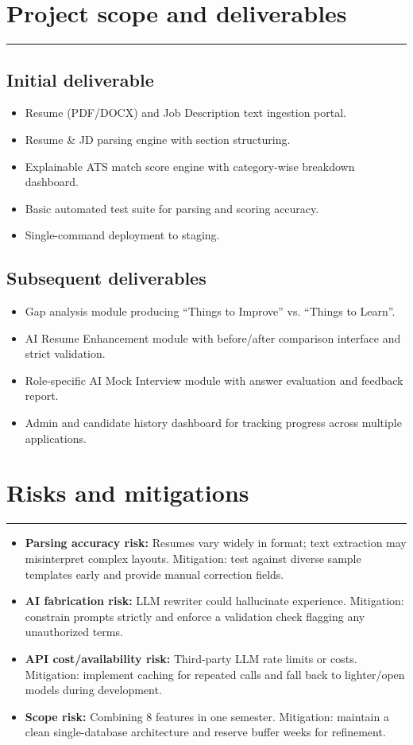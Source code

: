 \documentclass[11pt,a4paper]{article}
\newcommand{\BvrSectionRule}{%
  \par\nobreak\vspace{0.25em}%
  \noindent\rule{\linewidth}{0.4pt}%
  \par\nobreak\vspace{0.4em}%
}
\begin{document}
\section{Project scope and deliverables %
}
\BvrSectionRule
\subsection{Initial deliverable %
}
\begin{itemize}[leftmargin=0.7cm]
    \item Resume (PDF/DOCX) and Job Description text ingestion portal.
    \item Resume \& JD parsing engine with section structuring.
    \item Explainable ATS match score engine with category-wise breakdown dashboard.
    \item Basic automated test suite for parsing and scoring accuracy.
    \item Single-command deployment to staging.
\end{itemize}

\subsection{Subsequent deliverables}
\begin{itemize}[leftmargin=0.7cm]
    \item Gap analysis module producing ``Things to Improve'' vs. ``Things to Learn''.
    \item AI Resume Enhancement module with before/after comparison interface and strict validation.
    \item Role-specific AI Mock Interview module with answer evaluation and feedback report.
    \item Admin and candidate history dashboard for tracking progress across multiple applications.
\end{itemize}

\section{Risks and mitigations}
\BvrSectionRule
\begin{itemize}[leftmargin=0.7cm]
    \item \textbf{Parsing accuracy risk:} Resumes vary widely in format; text extraction may misinterpret complex layouts. Mitigation: test against diverse sample templates early and provide manual correction fields.
    \item \textbf{AI fabrication risk:} LLM rewriter could hallucinate experience. Mitigation: constrain prompts strictly and enforce a validation check flagging any unauthorized terms.
    \item \textbf{API cost/availability risk:} Third-party LLM rate limits or costs. Mitigation: implement caching for repeated calls and fall back to lighter/open models during development.
    \item \textbf{Scope risk:} Combining 8 features in one semester. Mitigation: maintain a clean single-database architecture and reserve buffer weeks for refinement.
\end{itemize}
\end{document}
